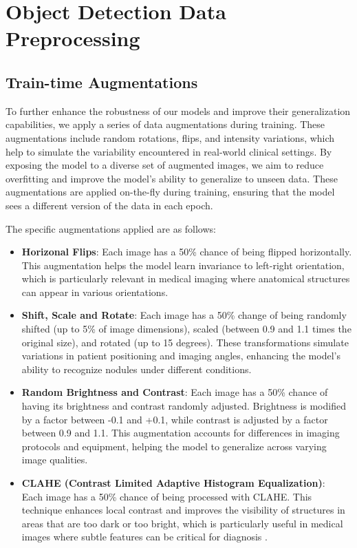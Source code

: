 \section{Object Detection Data Preprocessing}
\subsection{Train-time Augmentations}
\label{sec:augmentation}
To further enhance the robustness of our models and improve their generalization capabilities, we apply a series of data augmentations during training. These augmentations include random rotations, flips, and intensity variations, which help to simulate the variability encountered in real-world clinical settings. By exposing the model to a diverse set of augmented images, we aim to reduce overfitting and improve the model's ability to generalize to unseen data. These augmentations are applied on-the-fly during training, ensuring that the model sees a different version of the data in each epoch.

The specific augmentations applied are as follows:
\begin{itemize}
    \item \textbf{Horizonal Flips}: Each image has a 50\% chance of being flipped horizontally. This augmentation helps the model learn invariance to left-right orientation, which is particularly relevant in medical imaging where anatomical structures can appear in various orientations.
    \item \textbf{Shift, Scale and Rotate}: Each image has a 50\% change of being randomly shifted (up to 5\% of image dimensions), scaled (between 0.9 and 1.1 times the original size), and rotated (up to 15 degrees). These transformations simulate variations in patient positioning and imaging angles, enhancing the model's ability to recognize nodules under different conditions.
    \item \textbf{Random Brightness and Contrast}: Each image has a 50\% chance of having its brightness and contrast randomly adjusted. Brightness is modified by a factor between -0.1 and +0.1, while contrast is adjusted by a factor between 0.9 and 1.1. This augmentation accounts for differences in imaging protocols and equipment, helping the model to generalize across varying image qualities.
    \item \textbf{CLAHE (Contrast Limited Adaptive Histogram Equalization)}: \\Each image has a 50\% chance of being processed with CLAHE. This technique enhances local contrast and improves the visibility of structures in areas that are too dark or too bright, which is particularly useful in medical images where subtle features can be critical for diagnosis \cite{mishra2021clahe}.
\end{itemize}


